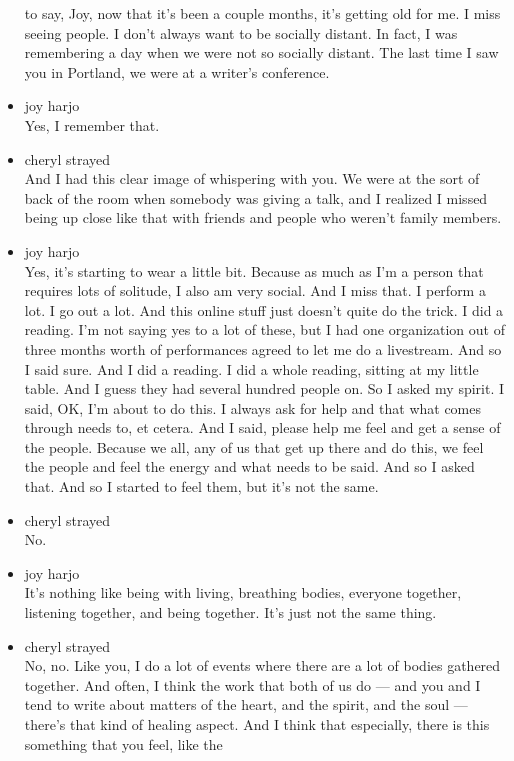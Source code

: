 \begin{itemize}
  to say, Joy, now that it's been a couple months, it's getting old for
  me. I miss seeing people. I don't always want to be socially distant.
  In fact, I was remembering a day when we were not so socially distant.
  The last time I saw you in Portland, we were at a writer's conference.
\item
  joy harjo\\
  Yes, I remember that.
\item
  cheryl strayed\\
  And I had this clear image of whispering with you. We were at the sort
  of back of the room when somebody was giving a talk, and I realized I
  missed being up close like that with friends and people who weren't
  family members.
\item
  joy harjo\\
  Yes, it's starting to wear a little bit. Because as much as I'm a
  person that requires lots of solitude, I also am very social. And I
  miss that. I perform a lot. I go out a lot. And this online stuff just
  doesn't quite do the trick. I did a reading. I'm not saying yes to a
  lot of these, but I had one organization out of three months worth of
  performances agreed to let me do a livestream. And so I said sure. And
  I did a reading. I did a whole reading, sitting at my little table.
  And I guess they had several hundred people on. So I asked my spirit.
  I said, OK, I'm about to do this. I always ask for help and that what
  comes through needs to, et cetera. And I said, please help me feel and
  get a sense of the people. Because we all, any of us that get up there
  and do this, we feel the people and feel the energy and what needs to
  be said. And so I asked that. And so I started to feel them, but it's
  not the same.
\item
  cheryl strayed\\
  No.
\item
  joy harjo\\
  It's nothing like being with living, breathing bodies, everyone
  together, listening together, and being together. It's just not the
  same thing.
\item
  cheryl strayed\\
  No, no. Like you, I do a lot of events where there are a lot of bodies
  gathered together. And often, I think the work that both of us do ---
  and you and I tend to write about matters of the heart, and the
  spirit, and the soul --- there's that kind of healing aspect. And I
  think that especially, there is this something that you feel, like the

\end{itemize}
